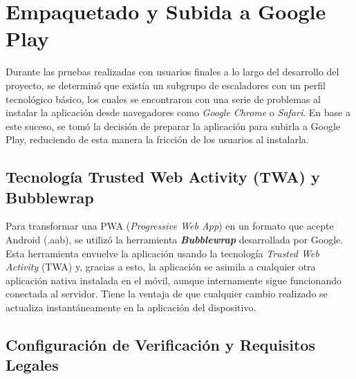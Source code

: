 \section{Empaquetado y Subida a Google Play}

Durante las pruebas realizadas con usuarios finales a lo largo del desarrollo del proyecto, se determinó que existía un subgrupo de escaladores con un perfil tecnológico básico, los cuales se encontraron con una serie de problemas al instalar la aplicación desde navegadores como \textit{Google Chrome} o \textit{Safari}. En base a este suceso, se tomó la decisión de preparar la aplicación para subirla a Google Play, reduciendo de esta manera la fricción de los usuarios al instalarla. 

\subsection{Tecnología Trusted Web Activity (TWA) y Bubblewrap}

Para transformar una PWA (\textit{Progressive Web App}) en un formato que acepte Android (.aab), se utilizó la herramienta \textbf{\textit{Bubblewrap}} desarrollada por Google. Esta herramienta envuelve la aplicación usando la tecnología \textit{Trusted Web Activity} (TWA) y, gracias a esto, la aplicación se asimila a cualquier otra aplicación nativa instalada en el móvil, aunque internamente sigue funcionando conectada al servidor. Tiene la ventaja de que cualquier cambio realizado se actualiza instantáneamente en la aplicación del dispositivo.

\subsection{Configuración de Verificación y Requisitos Legales}

